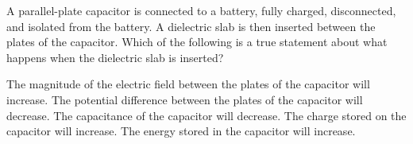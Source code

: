 \documentclass[12pt]{../../oss-apphys-exam}
\begin{document}
\begin{questions}
  
  \question A parallel-plate capacitor is connected to a battery, fully
  charged, disconnected, and isolated from the battery. A dielectric slab is
  then inserted between the plates of the capacitor. Which of the following is
  a true statement about what happens when the dielectric slab is inserted?
  \begin{choices}
    \choice The magnitude of the electric field between the plates of the
    capacitor will increase.
    \choice The potential difference between the plates of the capacitor will
    decrease.
    \choice The capacitance of the capacitor will decrease.
    \choice The charge stored on the capacitor will increase.
    \choice The energy stored in the capacitor will increase.
  \end{choices}
  \newpage


\end{questions}
\end{document}
